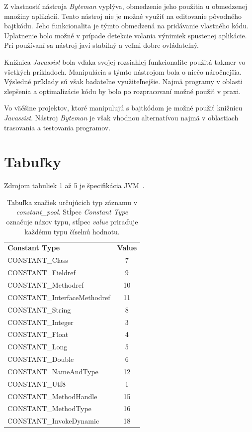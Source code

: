 \documentclass[11pt,final,oneside]{fithesis}
\begin{document}
Z vlastností nástroja \textit{Byteman} vyplýva, obmedzenie jeho použitia u
obmedzenej množiny aplikácií. Tento nástroj nie je možné využiť na 
editovanie pôvodného bajtkódu. Jeho funkcionalita je týmto obmedzená
na pridávanie vlastného kódu. Uplatnenie bolo možné v prípade
detekcie volania výnimiek spustenej aplikácie. Pri používaní sa nástroj javí
stabilný a veľmi dobre ovládateľný.

Knižnica \textit{Javassist} bola vďaka svojej rozsiahlej funkcionalite použitá
takmer vo všetkých príkladoch. Manipulácia s týmto nástrojom bola o niečo
náročnejšia. Výsledné príklady sú však badateľne využiteľnejšie. Najmä
programy v oblasti zlepšenia a optimalizácie kódu by bolo po rozpracovaní možné
použiť v praxi.

Vo väčšine projektov, ktoré manipulujú s bajtkódom je možné použiť knižnicu
\textit{Javassist}. Nástroj \textit{Byteman} je však vhodnou alternatívou najmä
v oblastiach trasovania a testovania programov.

\nocite{RedHat:Javassist}
\clearpage
{} 
 
 

\appendix

\chapter{Tabuľky}

Zdrojom tabuliek 1 až 5 je špecifikácia
JVM~\cite{Lindholm:2013:JVM:2462629}.

\begin{table}
  \begin{tabular}{| l | c |}
    \hline
    \textbf{Constant Type} & \textbf{Value} \\
    \hhline{|=|=|}
    CONSTANT\_Class & 7 \\ \hline
    CONSTANT\_Fieldref & 9 \\ \hline
    CONSTANT\_Methodref & 10 \\ \hline
    CONSTANT\_InterfaceMethodref & 11 \\ \hline
    CONSTANT\_String & 8 \\ \hline
    CONSTANT\_Integer & 3 \\ \hline
    CONSTANT\_Float & 4 \\ \hline
    CONSTANT\_Long & 5 \\ \hline
    CONSTANT\_Double & 6 \\ \hline
    CONSTANT\_NameAndType & 12 \\ \hline
    CONSTANT\_Utf8 & 1 \\ \hline
    CONSTANT\_MethodHandle & 15 \\ \hline
    CONSTANT\_MethodType & 16 \\ \hline
    CONSTANT\_InvokeDynamic & 18 \\
    \hline
  \end{tabular}
  \caption{Tabuľka značiek určujúcich typ záznamu v \textit{constant\_pool}.
  Stĺpec \textit{Constant Type} označuje názov typu, stĺpec \textit{value}
  priraďuje každému typu číselnú hodnotu.}
  \label{tab:tab1}
\end{table}
\end{document}
